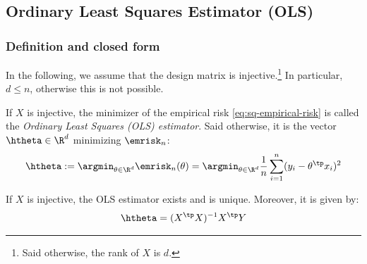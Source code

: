 \documentclass{../cs-classes/cs-classes}
\begin{document}
\subsection{Ordinary Least Squares Estimator (OLS)}
\subsubsection{Definition and closed form}
In the following, we assume that the design matrix is injective.\footnote{Said otherwise, the rank of $X$ is $d$.} In particular, $d\leq n$, otherwise this is not possible.

\begin{definition}
    If $X$ is injective, the minimizer of the empirical risk \eqref{eq:sq-empirical-risk} is called the \emph{Ordinary Least Squares (OLS) estimator}. Said otherwise, it is the vector $\htheta\in\R^d$ minimizing $\emrisk_n$:
    \begin{equation}
        \label{eq:ols-estimator}
        \htheta := \argmin_{\theta\in\R^d} \emrisk_n(\theta)=\argmin_{\theta\in\R^d}\frac{1}{n}\sum_{i=1}^n(y_i-\theta^\tp x_i)^2
    \end{equation}
\end{definition}

\begin{property}
    \label{prop:closed-form-OLS}
    If $X$ is injective, the OLS estimator exists and is unique. Moreover, it is given by:
    \begin{equation}
        \label{eq:closed-form-OLS}
        \htheta = (X^\tp X)^{-1}X^\tp Y
    \end{equation}
\end{property}
\end{document}
